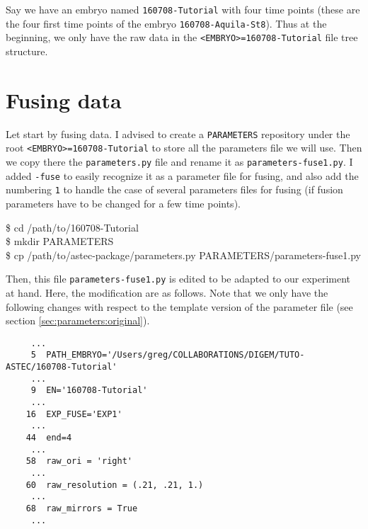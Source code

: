 Say we have an embryo named \texttt{160708-Tutorial} with four time points (these are the four first time points of the embryo \texttt{160708-Aquila-St8}). Thus at the beginning, we only have the raw data in the \texttt{<EMBRYO>=160708-Tutorial} file tree structure.










\section{Fusing data}

Let start by fusing data. I advised to create a \texttt{PARAMETERS} repository under the root \texttt{<EMBRYO>=160708-Tutorial} to store all the parameters file we will use. Then we copy there the \texttt{parameters.py} file and rename it as \texttt{parameters-fuse1.py}. I added \texttt{-fuse} to easily recognize it as a parameter file for fusing, and also add the numbering \texttt{1} to handle the case of several parameters files for fusing (if fusion parameters have to be changed for a few time points).

\begin{code}{0.8}
\$ cd /path/to/160708-Tutorial\\
\$ mkdir PARAMETERS\\
\$ cp /path/to/astec-package/parameters.py  PARAMETERS/parameters-fuse1.py
\end{code}


Then, this file \texttt{parameters-fuse1.py} is edited to be adapted to our experiment at hand. Here, the modification are as follows. Note that we only have the following changes with respect to the template version of the parameter file (see section \ref{sec:parameters:original}).

\begin{verbatim}
     ...
     5	PATH_EMBRYO='/Users/greg/COLLABORATIONS/DIGEM/TUTO-ASTEC/160708-Tutorial'	
     ...
     9	EN='160708-Tutorial'			
     ... 
    16	EXP_FUSE='EXP1'	
     ...
    44	end=4   				 
     ...
    58	raw_ori = 'right' 				
     ...
    60	raw_resolution = (.21, .21, 1.) 
     ...
    68	raw_mirrors = True  			
     ...
\end{verbatim}

